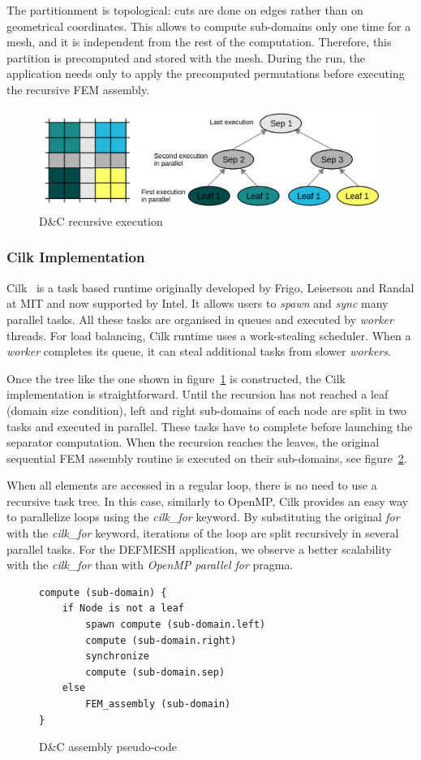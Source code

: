 \documentclass{IOS-Book-Article}
\begin{document}
The partitionment is topological: cuts are done on edges rather than on geometrical coordinates.
This allows to compute sub-domains only one time for a mesh, and it is independent from the rest of the computation. Therefore, this partition is precomputed and stored with the mesh.
During the run, the application needs only to apply the precomputed permutations before executing the recursive FEM assembly.
\begin{figure}[htp]
 \centering
 \includegraphics[scale=0.25]{DC_recursion.png}
 \caption{D\&C recursive execution}
 \label{fig:DCrec}
\end{figure}

\subsubsection{Cilk Implementation}
Cilk~\cite{cilk5} is a task based runtime originally developed by Frigo, Leiserson and Randal at MIT and now supported by Intel.
It allows users to \emph{spawn} and \emph{sync} many parallel tasks.
All these tasks are organised in queues and executed by \emph{worker} threads.
For load balancing, Cilk runtime uses a work-stealing scheduler. When a \emph{worker} completes its queue, it can steal additional tasks from slower \emph{workers}.

Once the tree like the one shown in figure~\ref{fig:DCrec} is constructed, the Cilk implementation is straightforward.
Until the recursion has not reached a leaf (domain size condition), left and right sub-domains of each node are split in two tasks and executed in parallel.
These tasks have to complete before launching the separator computation. 
When the recursion reaches the leaves, the original sequential FEM assembly routine is executed on their sub-domains, see figure~\ref{fig:DCcode}.

When all elements are accessed in a regular loop, there is no need to use a recursive task tree.
In this case, similarly to OpenMP, Cilk provides an easy way to parallelize loops using the \emph{cilk\_for} keyword.
By substituting the original \emph{for} with the \emph{cilk\_for} keyword, iterations of the loop are split recursively in several parallel tasks.
For the DEFMESH application, we observe a better scalability with the \emph{cilk\_for} than with \emph{OpenMP parallel for} pragma.
\begin{figure}[htp]
 \begin{verbatim}
compute (sub-domain) {
    if Node is not a leaf
        spawn compute (sub-domain.left)
        compute (sub-domain.right)
        synchronize
        compute (sub-domain.sep)
    else
        FEM_assembly (sub-domain)
}
 \end{verbatim}
 \caption{D\&C assembly pseudo-code}
 \label{fig:DCcode}
\end{figure}
\end{document}
